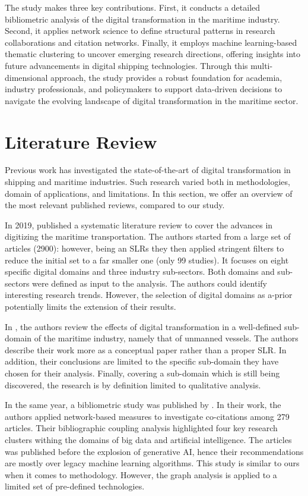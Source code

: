 \documentclass[a4paper, review, endfloat, doubleblind, authoryear]{elsarticle}
\begin{document}
	The study makes three key contributions. First, it conducts a detailed bibliometric analysis of the digital transformation in the maritime industry. Second, it applies network science to define structural patterns in research collaborations and citation networks. Finally, it employs machine learning-based thematic clustering to uncover emerging research directions, offering insights into future advancements in digital shipping technologies. Through this multi-dimensional approach, the study provides a robust foundation for academia, industry professionals, and policymakers to support data-driven decisions to navigate the evolving landscape of digital transformation in the maritime sector.
	
	\section{Literature Review}
	Previous work has investigated the state-of-the-art of digital transformation in shipping and maritime industries. Such research varied both in methodologies, domain of applications, and limitations. In this section, we offer an overview of the most relevant published reviews, compared to our study.
	
	In 2019, \citep{sanchez2019toward} published a systematic literature review to cover the advances in digitizing the maritime transportation. The authors started from a large set of articles (2900): however, being an SLRs they then applied stringent filters to reduce the initial set to a far smaller one (only 99 studies). It focuses on eight specific digital domains and three industry sub-sectors. Both domains and sub-sectors were defined as input to the analysis. The authors could identify interesting research trends. However, the selection of digital domains as a-prior potentially limits the extension of their results.
	
	In \citep{poulis2020value}, the authors review the effects of digital transformation in a well-defined sub-domain of the maritime industry, namely that of unmanned vessels. The authors describe their work more as a conceptual paper rather than a proper SLR. In addition, their conclusions are limited to the specific sub-domain they have chosen for their analysis. Finally, covering a sub-domain which is still being discovered, the research is by definition limited to qualitative analysis.
	
	In the same year, a bibliometric study was published by \citep{munim2020big}. In their work, the authors applied network-based measures to investigate co-citations among 279 articles. Their bibliographic coupling analysis highlighted four key research clusters withing the domains of big data and artificial intelligence. The articles was published before the explosion of generative AI, hence their recommendations are mostly over legacy machine learning algorithms. This study is similar to ours when it comes to methodology. However, the graph analysis is applied to a limited set of pre-defined technologies.
	
\end{document}

